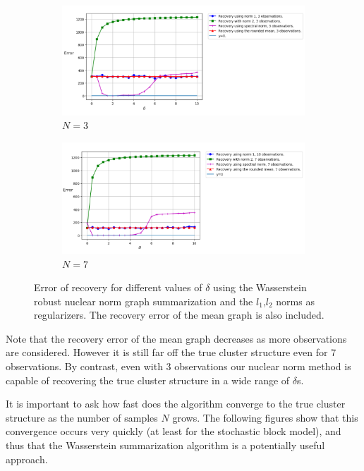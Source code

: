 \documentclass[12pt]{amsart}
\theoremstyle{remark}
\begin{document}
\begin{figure}[H]
     \centering
     \begin{subfigure}[b]{1\textwidth}
         \centering
         \includegraphics[width=\textwidth]{./Pictures/differentNorms.PNG}
\caption{$N=3$}
     \end{subfigure}
     \hfill
     \begin{subfigure}[b]{1\textwidth}
         \centering
         \includegraphics[width=\textwidth]{./Pictures/differentNorms7.PNG}
         \caption{$N=7$}
     \end{subfigure}
\caption{Error of recovery for different values of $\delta$ using the Wasserstein robust nuclear norm graph summarization and the $l_1$,$l_2$ norms as regularizers. The recovery error of the mean graph is also included.}
        \label{fig:differentNorms}
\end{figure}


Note that the recovery error of the mean graph decreases as more observations are considered. However it is still far off the true cluster structure even for 7 observations. By contrast, even with 3 observations our nuclear norm method is capable of recovering the true cluster structure in a wide range of $\delta$s. 
  
It is important to ask how fast does  the algorithm converge to the true cluster structure as the number of samples $N$ grows. The following figures show that this convergence occurs very quickly (at least for the stochastic block model), and thus that the Wasserstein summarization algorithm is a potentially useful approach.
\end{document}
